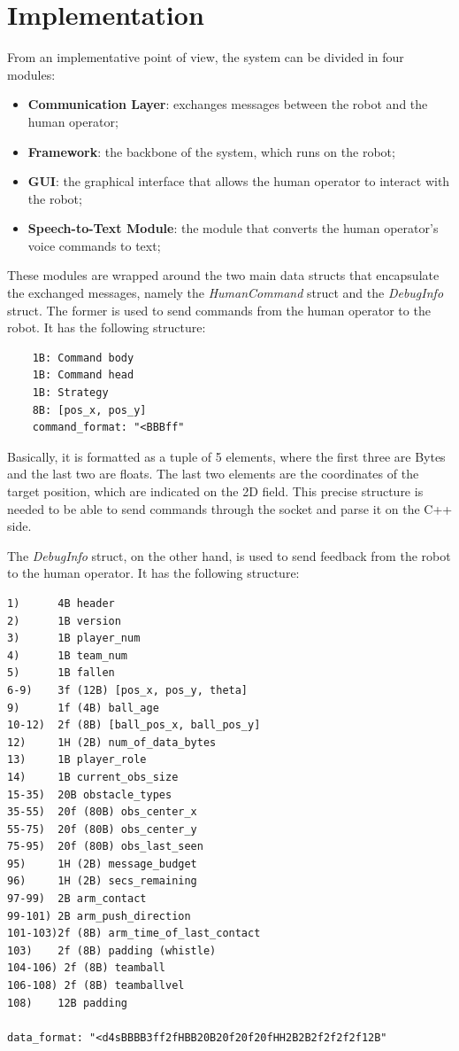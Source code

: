 \documentclass[a4paper, onecolumn, 12pt]{article}
\begin{document}
\newpage
\section{Implementation}
\label{sec:impl}

From an implementative point of view, the system can be divided in four modules: 
\begin{itemize}
    \item \textbf{Communication Layer}: exchanges messages between the robot and the human operator;
    \item \textbf{Framework}: the backbone of the system, which runs on the robot;
    \item \textbf{GUI}: the graphical interface that allows the human operator to interact with the robot;
    \item \textbf{Speech-to-Text Module}: the module that converts the human operator's voice commands to text;
\end{itemize}

These modules are wrapped around the two main data structs that encapsulate the
exchanged messages, namely the \textit{HumanCommand} struct and the
\textit{DebugInfo} struct. The former is used to send commands from the human
operator to the robot. It has the following structure:
\begin{verbatim}
    1B: Command body
    1B: Command head
    1B: Strategy
    8B: [pos_x, pos_y]
    command_format: "<BBBff"
\end{verbatim}

Basically, it is formatted as a tuple of 5 elements, where the first three are
Bytes and the last two are floats. The last two elements are the coordinates of
the target position, which are indicated on the 2D field. This precise structure
is needed to be able to send commands through the socket and parse it on the
C++ side.

The \textit{DebugInfo} struct, on the other hand, is used to send feedback from
the robot to the human operator. It has the following structure:

\begin{verbatim}
1)      4B header
2)      1B version
3)      1B player_num
4)      1B team_num
5)      1B fallen
6-9)    3f (12B) [pos_x, pos_y, theta]
9)      1f (4B) ball_age
10-12)  2f (8B) [ball_pos_x, ball_pos_y]
12)     1H (2B) num_of_data_bytes
13)     1B player_role
14)     1B current_obs_size
15-35)  20B obstacle_types  
35-55)  20f (80B) obs_center_x
55-75)  20f (80B) obs_center_y
75-95)  20f (80B) obs_last_seen
95)     1H (2B) message_budget
96)     1H (2B) secs_remaining
97-99)  2B arm_contact
99-101) 2B arm_push_direction
101-103)2f (8B) arm_time_of_last_contact
103)    2f (8B) padding (whistle)
104-106) 2f (8B) teamball
106-108) 2f (8B) teamballvel
108)    12B padding

data_format: "<d4sBBBB3ff2fHBB20B20f20f20fHH2B2B2f2f2f2f12B"
\end{verbatim}
\end{document}
